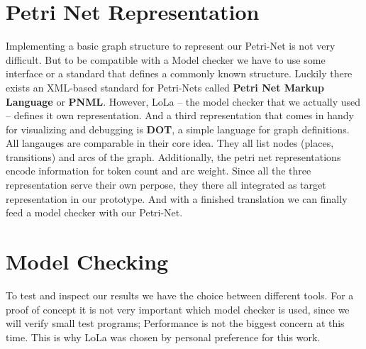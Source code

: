 \section{Petri Net Representation}
\label{app_petri}
Implementing a basic graph structure to represent our Petri-Net is not very difficult.
But to be compatible with a Model checker we have to use some interface or a standard that
defines a commonly known structure.
Luckily there exists an XML-based standard for Petri-Nets called \textbf{Petri Net Markup Language}\cite{pnml}\cite{kindler2006petri} or \textbf{PNML}.
However, LoLa -- the model checker that we actually used -- defines it own representation.
And a third representation that comes in handy for visualizing and debugging is \textbf{DOT}\cite{koutsofios1996drawing}, a simple language for graph definitions.
All langauges are comparable in their core idea.
They all list nodes (places, transitions) and arcs of the graph. 
Additionally, the petri net representations encode information for token count and arc weight.
Since all the three representation serve their own perpose, they there all integrated as target representation in our prototype.
And with a finished translation we can finally feed a model checker with our Petri-Net.

\section{Model Checking}
\label{app_mc}
To test and inspect our results we have the choice between different tools.
For a proof of concept it is not very important which model checker is used, since we will verify small test programs;
Performance is not the biggest concern at this time.
This is why LoLa was chosen by personal preference for this work.

